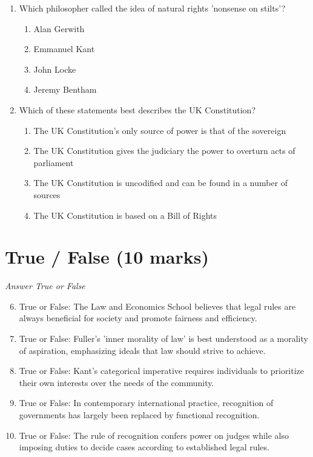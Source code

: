 \documentclass[12pt]{article}
\begin{document}
\begin{enumerate}[label=\arabic*.]
\begin{enumerate}[label=(\alph*)]
\end{enumerate}
\item Which philosopher called the idea of natural rights 'nonsense on stilts'?
\begin{enumerate}[label=(\alph*)]
    \item Alan Gerwith
    \item Emmanuel Kant
    \item John Locke
    \item Jeremy Bentham
\end{enumerate}
\item Which of these statements best describes the UK Constitution?
\begin{enumerate}[label=(\alph*)]
    \item The UK Constitution's only source of power is that of the sovereign
    \item The UK Constitution gives the judiciary the power to overturn acts of parliament
    \item The UK Constitution is uncodified and can be found in a number of sources
    \item The UK Constitution is based on a Bill of Rights
\end{enumerate}
\end{enumerate}

\section*{True / False (10 marks)}
\textit{Answer True or False}
\begin{enumerate}[label=\arabic*.]
\setcounter{enumi}{5}
\item True or False: The Law and Economics School believes that legal rules are always beneficial for society and promote fairness and efficiency.
\item True or False: Fuller's 'inner morality of law' is best understood as a morality of aspiration, emphasizing ideals that law should strive to achieve.
\item True or False: Kant's categorical imperative requires individuals to prioritize their own interests over the needs of the community.
\item True or False: In contemporary international practice, recognition of governments has largely been replaced by functional recognition.
\item True or False: The rule of recognition confers power on judges while also imposing duties to decide cases according to established legal rules.
\end{enumerate}
\end{document}
